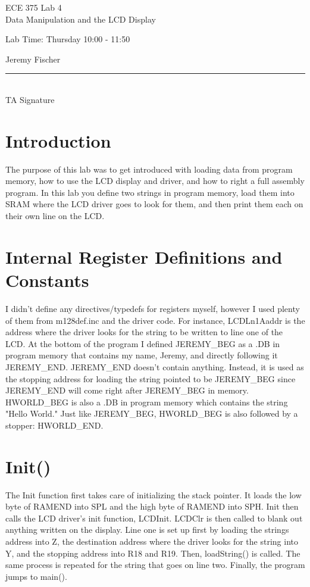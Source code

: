 \documentclass[12pt,letterpaper]{article}
\begin{document}
\begin{titlepage}
    \vspace*{4cm}
    \begin{flushright}
    {\huge
        ECE 375 Lab 4\\[1cm]
    }
    {\large
       Data Manipulation and the LCD Display
    }
    \end{flushright}
    \begin{flushleft}
    Lab Time: Thursday  10:00 - 11:50
    \end{flushleft}
    \begin{flushright}
    Jeremy Fischer

    \vfill
    \rule{5in}{.5mm}\\
    TA Signature
    \end{flushright}

\end{titlepage}

\section{Introduction}
	The purpose of this lab was to get introduced with loading data from program memory, how to use the LCD display and driver, and how to right a full assembly program.
	In this lab you define two strings in program memory, load them into SRAM where the LCD driver goes to look for them, and then print them each on their own line on the LCD.


\section{Internal Register Definitions and Constants}
	I didn't define any directives/typedefs for registers myself, however I used plenty of them from m128def.inc and the driver code. 
	For instance, LCDLn1Aaddr is the address where the driver looks for the string to be written to line one of the LCD.
	At the bottom of the program I defined JEREMY\_BEG as a .DB in program memory that contains my name, Jeremy, and directly following it JEREMY\_END.
	JEREMY\_END doesn't contain anything.
	Instead, it is used as the stopping address for loading the string pointed to be JEREMY\_BEG since JEREMY\_END will come right after JEREMY\_BEG in memory.
	HWORLD\_BEG is also a .DB in program memory which contains the string "Hello World."
	Just like 	JEREMY\_BEG, HWORLD\_BEG is also followed by a stopper: HWORLD\_END.

\section{Init()}
	The Init function first takes care of initializing the stack pointer.
	It loads the low byte of RAMEND into SPL and the high byte of RAMEND into SPH.
	Init then calls the LCD driver's init function, LCDInit.
	LCDClr is then called to blank out anything written on the display.
	Line one is set up first by loading the strings address into Z, the destination address where the driver looks for the string into Y, and the stopping address into R18 and R19.
	Then, loadString() is called.
	The same process is repeated for the string that goes on line two.
	Finally, the program jumps to main().
\end{document}
